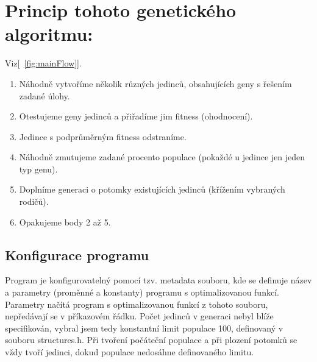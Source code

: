 \documentclass{article}
\begin{document}
\section{Princip tohoto genetického algoritmu:} 
Viz[~\ref{fig:mainFlow}].
\begin{enumerate}
\item Náhodně vytvoříme několik různých jedinců, obsahujících geny s řešením zadané úlohy.
\item Otestujeme geny jedinců a přiřadíme jim fitness (ohodnocení).
\item Jedince s podprůměrným fitness odstraníme.
\item Náhodně zmutujeme zadané procento populace (pokaždé u jedince jen jeden typ genu).
\item Doplníme generaci o potomky existujících jedinců (křížením vybraných rodičů).
\item Opakujeme body 2 až 5. \ 
\end{enumerate}


\subsection{Konfigurace programu}

Program je konfigurovatelný pomocí tzv. metadata souboru, kde se definuje název a parametry (proměnné a konstanty) programu s optimalizovanou funkcí. Parametry načítá program s optimalizovanou funkcí z tohoto souboru, nepředávají se v příkazovém řádku. Počet jedinců v generaci nebyl blíže specifikován, vybral jsem tedy konstantní limit populace 100, definovaný v souboru structures.h. Při tvoření počáteční populace a při plození potomků se vždy tvoří jedinci, dokud populace nedosáhne definovaného limitu.
\end{document}
